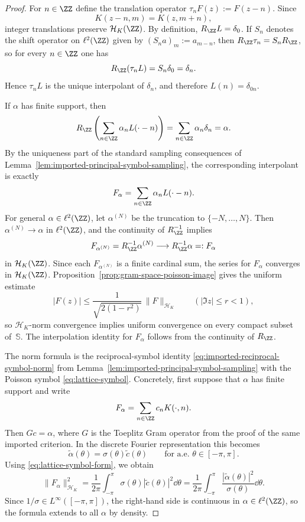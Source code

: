 \begin{proof}
For $n\in\ZZ$ define the translation operator
$\tau_nF(z):=F(z-n)$.  Since
\[
K(z-n,m)=K(z,m+n),
\]
integer translations preserve $\mathcal H_K(\ZZ)$.  By definition,
$R_{\ZZ}L=\delta_0$.  If $S_n$ denotes the shift operator on
$\ell^2(\ZZ)$ given by $(S_na)_m:=a_{m-n}$, then
$R_{\ZZ}\tau_n=S_nR_{\ZZ}$, so for every $n\in\ZZ$
one has
\[
R_{\ZZ}(\tau_nL)=S_n\delta_0=\delta_n.
\]
Hence $\tau_nL$ is the unique interpolant of $\delta_n$, and therefore
$L(n)=\delta_{0n}$.

If $\alpha$ has finite support, then
\[
R_{\ZZ}\left(\sum_{n\in\ZZ}\alpha_nL(\cdot-n)\right)
=\sum_{n\in\ZZ}\alpha_n\delta_n
=\alpha.
\]
By the uniqueness part of
the standard sampling consequences of
Lemma~\ref{lem:imported-principal-symbol-sampling}, the corresponding
interpolant
is exactly
\[
F_\alpha=\sum_{n\in\ZZ}\alpha_nL(\cdot-n).
\]
For general $\alpha\in\ell^2(\ZZ)$, let $\alpha^{(N)}$ be the truncation
to $\{-N,\dots,N\}$.  Then $\alpha^{(N)}\to\alpha$ in $\ell^2(\ZZ)$, and
the continuity of $R_{\ZZ}^{-1}$ implies
\[
F_{\alpha^{(N)}}=R_{\ZZ}^{-1}\alpha^{(N)}
\longrightarrow
R_{\ZZ}^{-1}\alpha=:F_\alpha
\]
in $\mathcal H_K(\ZZ)$.  Since each $F_{\alpha^{(N)}}$ is a finite
cardinal sum, the series for $F_\alpha$ converges in $\mathcal H_K(\ZZ)$.
Proposition~\ref{prop:gram-space-poisson-image} gives the uniform estimate
\[
|F(z)|\le \frac{1}{\sqrt{2(1-r^2)}}\,\|F\|_{\mathcal H_K}
\qquad(|\Im z|\le r<1),
\]
so $\mathcal H_K$-norm convergence implies uniform convergence on every
compact subset of~$\mathbb S$.  The interpolation identity for $F_\alpha$
follows from the continuity of $R_{\ZZ}$.

The norm formula is the reciprocal-symbol identity
\eqref{eq:imported-reciprocal-symbol-norm} from
Lemma~\ref{lem:imported-principal-symbol-sampling} with the Poisson symbol
\eqref{eq:lattice-symbol}.  Concretely, first suppose that $\alpha$
has finite support and write
\[
F_\alpha=\sum_{n\in\ZZ}c_nK(\cdot,n).
\]
Then $Gc=\alpha$, where $G$ is the Toeplitz Gram operator from the proof
of the same imported criterion.  In the discrete Fourier
representation this becomes
\[
\widetilde\alpha(\theta)=\sigma(\theta)\widetilde c(\theta)
\qquad\text{for a.e. }\theta\in[-\pi,\pi].
\]
Using \eqref{eq:lattice-symbol-form}, we obtain
\[
\|F_\alpha\|_{\mathcal H_K}^2
=\frac{1}{2\pi}\int_{-\pi}^{\pi}
\sigma(\theta)|\widetilde c(\theta)|^2\dd\theta
=\frac{1}{2\pi}\int_{-\pi}^{\pi}
\frac{|\widetilde\alpha(\theta)|^2}{\sigma(\theta)}\dd\theta.
\]
Since $1/\sigma\in L^\infty([-\pi,\pi])$, the right-hand side is
continuous in $\alpha\in\ell^2(\ZZ)$, so the formula extends to all
$\alpha$ by density.


\end{proof}
